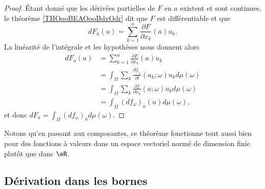 \begin{proof}
	Étant donné que les dérivées partielles de \( F\) en \( a\) existent et sont continues, le théorème \ref{THOooBEAOooBdvOdr} dit que \( F\) est différentiable et que
	\begin{equation}
		dF_a(u)=\sum_{k=1}^n\frac{ \partial F }{ \partial x_k }(a)u_k.
	\end{equation}
	La linéarité de l'intégrale et les hypothèses nous donnent alors
	\begin{subequations}
		\begin{align}
			dF_a(u) & =\sum_{k=1}^n\frac{ \partial F }{ \partial x_k }(a)u_k                                 \\
			        & =\int_{\Omega}\sum_k\frac{ \partial f_{|_k} }{ \partial t }(a_k;\omega)u_kd\mu(\omega) \\
			        & =\int_{\Omega}\sum_k\frac{ \partial f }{ \partial x_k }(a;\omega)u_kd\mu(\omega)       \\
			        & =\int_{\Omega}(df_{\omega})_a(u)d\mu(\omega),
		\end{align}
	\end{subequations}
	et donc \( dF_a=\int_{\Omega}(df_{\omega})_ad\mu(\omega)\).
\end{proof}
Notons qu'en passant aux composantes, ce théorème fonctionne tout aussi bien pour des fonctions à valeurs dans un espace vectoriel normé de dimension finie plutôt que dans \( \eR\).


\subsection{Dérivation dans les bornes}


